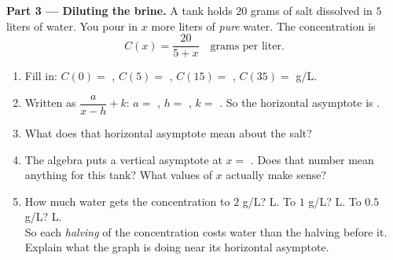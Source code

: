 \documentclass[10pt]{article}
\begin{document}
\begin{tcolorbox}[colback=white, colframe=black!40, title=\textbf{Tier E --- Extension},
    fonttitle=\bfseries, arc=1.5mm, left=3mm, right=3mm, top=2mm, bottom=2mm, breakable]
\vspace{5pt}
\textbf{Part 3 --- Diluting the brine.} A tank holds $20$ grams of salt dissolved in $5$ liters of
water. You pour in $x$ more liters of \emph{pure} water. The concentration is
\[ C(x)=\frac{20}{5+x} \quad \text{grams per liter.} \]
\begin{enumerate}[label=(\alph*), leftmargin=1.9em, itemsep=6pt]
  \item Fill in: $C(0)=$ , \; $C(5)=$ , \; $C(15)=$ , \;
        $C(35)=$  g/L.
  \item Written as $\dfrac{a}{x-h}+k$: \; $a=$ , \; $h=$ , \;
        $k=$ . So the horizontal asymptote is .
  \item What does that horizontal asymptote mean about the salt? 
  \item The algebra puts a vertical asymptote at $x=$ . Does that number mean anything
        for this tank?  \; What values of $x$ actually make sense? 
  \item How much water gets the concentration to $2$ g/L?  L. \; To $1$ g/L?
         L. \; To $0.5$ g/L?  L. \\[3pt]
        So each \emph{halving} of the concentration costs  water than the halving before
        it. Explain what the graph is doing near its horizontal asymptote. 
\end{enumerate}
\end{tcolorbox}
\end{document}
